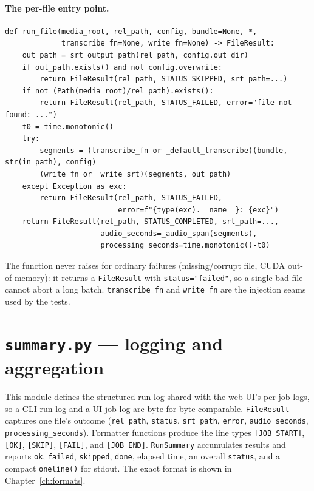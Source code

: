 \documentclass[11pt,a4paper]{report}
\newcommand{\code}[1]{\texttt{\small #1}}
\begin{document}
\paragraph{The per-file entry point.}

\begin{lstlisting}[caption={\texttt{run\_file}: failures are values, not exceptions.}]
def run_file(media_root, rel_path, config, bundle=None, *,
             transcribe_fn=None, write_fn=None) -> FileResult:
    out_path = srt_output_path(rel_path, config.out_dir)
    if out_path.exists() and not config.overwrite:
        return FileResult(rel_path, STATUS_SKIPPED, srt_path=...)
    if not (Path(media_root)/rel_path).exists():
        return FileResult(rel_path, STATUS_FAILED, error="file not found: ...")
    t0 = time.monotonic()
    try:
        segments = (transcribe_fn or _default_transcribe)(bundle, str(in_path), config)
        (write_fn or _write_srt)(segments, out_path)
    except Exception as exc:
        return FileResult(rel_path, STATUS_FAILED,
                          error=f"{type(exc).__name__}: {exc}")
    return FileResult(rel_path, STATUS_COMPLETED, srt_path=...,
                      audio_seconds=_audio_span(segments),
                      processing_seconds=time.monotonic()-t0)
\end{lstlisting}

The function never raises for ordinary failures (missing/corrupt file, CUDA
out-of-memory): it returns a \code{FileResult} with \code{status="failed"}, so a
single bad file cannot abort a long batch. \code{transcribe\_fn} and
\code{write\_fn} are the injection seams used by the tests.

\section{\texttt{summary.py} --- logging and aggregation}

This module defines the structured run log shared with the web UI's per-job logs,
so a CLI run log and a UI job log are byte-for-byte comparable. \code{FileResult}
captures one file's outcome (\code{rel\_path}, \code{status}, \code{srt\_path},
\code{error}, \code{audio\_seconds}, \code{processing\_seconds}). Formatter
functions produce the line types \code{[JOB START]}, \code{[OK]}, \code{[SKIP]},
\code{[FAIL]}, and \code{[JOB END]}. \code{RunSummary} accumulates results and
reports \code{ok}, \code{failed}, \code{skipped}, \code{done}, elapsed time, an
overall \code{status}, and a compact \code{oneline()} for stdout. The exact format
is shown in Chapter~\ref{ch:formats}.
\end{document}
